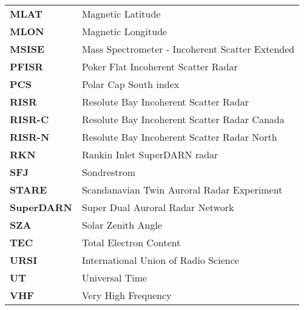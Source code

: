 \begin{longtable}{ll}
\textbf{MLAT} & Magnetic Latitude \\
\textbf{MLON} & Magnetic Longitude \\
\textbf{MSISE} & Mass Spectrometer - Incoherent Scatter Extended \\
\textbf{PFISR} & Poker Flat Incoherent Scatter Radar \\
\textbf{PCS} & Polar Cap South index \\
\textbf{RISR} & Resolute Bay Incoherent Scatter Radar \\
\textbf{RISR-C} & Resolute Bay Incoherent Scatter Radar Canada \\
\textbf{RISR-N} & Resolute Bay Incoherent Scatter Radar North \\
\textbf{RKN} & Rankin Inlet SuperDARN radar \\
\textbf{SFJ} & Sondrestrom \\
\textbf{STARE} & Scandanavian Twin Auroral Radar Experiment \\
\textbf{SuperDARN} & Super Dual Auroral Radar Network \\
\textbf{SZA} & Solar Zenith Angle \\
\textbf{TEC} & Total Electron Content \\
\textbf{URSI} & International Union of Radio Science \\
\textbf{UT} & Universal Time \\
\textbf{VHF} & Very High Frequency
\end{longtable}